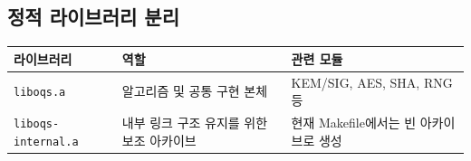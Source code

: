 \subsection{정적 라이브러리 분리}
\begin{center}
\begin{tabular}{p{}p{}p{}}
\toprule
라이브러리 & 역할 & 관련 모듈 \\
\midrule
\texttt{liboqs.a} & 알고리즘 및 공통 구현 본체 & KEM/SIG, AES, SHA, RNG 등 \\
\texttt{liboqs-internal.a} & 내부 링크 구조 유지를 위한 보조 아카이브 & 현재 Makefile에서는 빈 아카이브로 생성 \\
\bottomrule
\end{tabular}
\end{center}
